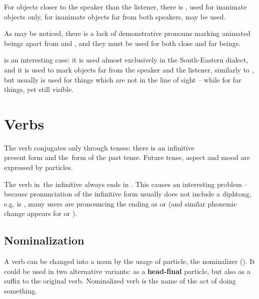 For objects closer to the speaker than the listener, there is , used
for inanimate objects only, for inanimate objects far from both speakers,
 may be used.

As may be noticed, there is a lack of demonstrative pronouns marking animated
beings apart from  and , and they must be used for both
close and far beings.


 is an interesting case: it is used almost exclusively in the
South-Eastern dialect, and it is used to mark objects far from the speaker and
the listener, similarly to , but usually is used for things which
are not in the line of sight -- while  for far things, yet still
visible.

\section{Verbs}

The verb conjugates only through tenses: there is an infinitive\\present form and
the~form of the past tense. Future tense, aspect and mood are expressed by
particles.

The verb in~the infinitive always ends in . This causes an interesting
problem -- because pronunciation of the infinitive form usually does not include
a diphtong, e.g.  is , many users are
pronouncing the ending  as  or  (and similar phonemic
change appears for  or ).



\subsection{Nominalization}

A verb can be changed into a noun by the usage of  particle, the
nominalizer (\Nmlz{}). It could be used in two alternative variants: as a
\textbf{head-final} particle, but also as a suffix to the original verb.
Nominalized verb is the name of the act of doing something.

